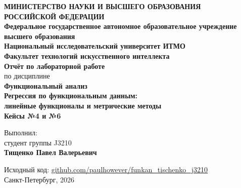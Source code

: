 \documentclass[12pt,a4paper]{article}
\theoremstyle{definition}
\theoremstyle{remark}
\begin{document}
\begin{titlepage}
    \begin{center}
        \textbf{МИНИСТЕРСТВО НАУКИ И ВЫСШЕГО ОБРАЗОВАНИЯ\\
        РОССИЙСКОЙ ФЕДЕРАЦИИ}\\[0.4cm]

        \textbf{Федеральное государственное автономное образовательное учреждение\\
        высшего образования}\\[0.2cm]

        \textbf{Национальный исследовательский университет ИТМО}\\[1.2cm]

        \textbf{Факультет технологий искусственного интеллекта}\\[1.5cm]

        \textbf{\Large Отчёт по лабораторной работе}\\[0.4cm]

        по дисциплине\\
        \textbf{Функциональный анализ}\\[0.8cm]

        \textbf{\Large Регрессия по функциональным данным:}\\[0.2cm]
        \textbf{\Large линейные функционалы и метрические методы}\\[0.6cm]

        \textbf{Кейсы №4 и №6}\\[2.5cm]
    \end{center}

    \begin{flushright}
        Выполнил:\\
        студент группы J3210\\
        \textbf{Тищенко Павел Валерьевич}
    \end{flushright}

    \vfill

    \begin{center}
        Исходный код:
        \href{https://github.com/paulhowever/funkan_tischenko_j3210}%
             {github.com/paulhowever/funkan\_tischenko\_j3210}\\[0.4cm]
        Санкт-Петербург, 2026
    \end{center}
\end{titlepage}
\end{document}
